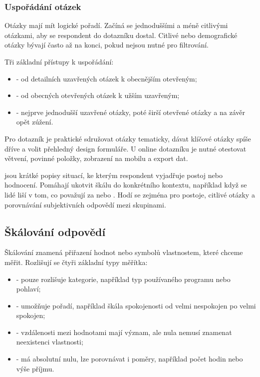 \subsubsection{Uspořádání otázek}
Otázky mají mít logické pořadí. Začíná se jednoduššími a méně citlivými otázkami, aby se respondent
do dotazníku dostal. Citlivé nebo demografické otázky bývají často až na konci, pokud nejsou nutné
pro filtrování.

Tři základní přístupy k uspořádání:
\begin{itemize}
  \item {} - od detailních uzavřených otázek k obecnějším otevřeným;
  \item {} - od obecných otevřených otázek k užším uzavřeným;
  \item {} - nejprve jednodušší uzavřené otázky, poté širší otevřené otázky a na závěr opět zúžení.
\end{itemize}

Pro dotazník je praktické sdružovat otázky tematicky, dávat klíčové otázky spíše dříve a volit
přehledný design formuláře. U online dotazníku je nutné otestovat větvení, povinné položky,
zobrazení na mobilu a export dat.

 jsou krátké popisy situací, ke kterým respondent vyjadřuje postoj nebo hodnocení.
Pomáhají ukotvit škálu do konkrétního kontextu, například když se lidé liší v tom, co považují za
 nebo . Hodí se zejména pro postoje, citlivé otázky a
porovnávání subjektivních odpovědí mezi skupinami.

\subsection{Škálování odpovědí}
Škálování znamená přiřazení hodnot nebo symbolů vlastnostem, které chceme měřit. Rozlišují se čtyři
základní typy měřítka:
\begin{itemize}
  \item {} - pouze rozlišuje kategorie, například typ používaného programu nebo pohlaví;
  \item {} - umožňuje pořadí, například škála spokojenosti od velmi nespokojen po velmi spokojen;
  \item {} - vzdálenosti mezi hodnotami mají význam, ale nula nemusí znamenat neexistenci vlastnosti;
  \item {} - má absolutní nulu, lze porovnávat i poměry, například počet hodin nebo výše příjmu.
\end{itemize}

